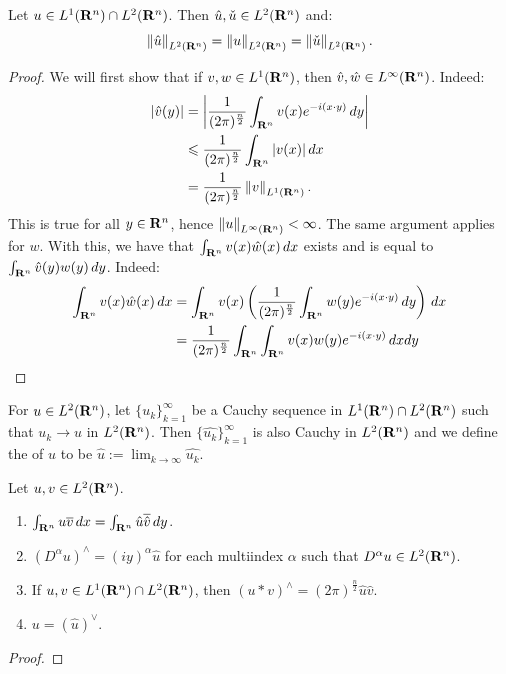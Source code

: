 \begin{theorem}[Plancharel]
	Let $u \in L^1(\mathbf{R}^n)\cap L^2(\mathbf{R}^n)$. Then $\hat{u},\check{u} \in L^2(\mathbf{R}^n)$ and:
	\[
		\left\lVert \hat{u} \right\rVert_{L^2(\mathbf{R}^n)} = \left\lVert u \right\rVert_{L^2(\mathbf{R}^n)} = \left\lVert \check{u} \right\rVert_{L^2(\mathbf{R}^n)}.
	\] 
\end{theorem}
	\begin{proof}
		We will first show that if $v,w \in L^1(\mathbf{R}^n)$, then $\hat{v},\hat{w} \in L^\infty(\mathbf{R}^n)$. Indeed:
		\begin{align*}
			|\hat{v}(y)| 
			&= \left| \frac{1}{(2\pi)^{\frac{n}{2}}} \int_{\mathbf{R}^n}^{} v(x)e^{-i (x \cdot y)}\,dy \right|  \\
			& \leqslant \frac{1}{(2\pi)^{\frac{n}{2}}} \int_{\mathbf{R}^n}^{} |v(x)|\,dx \\
			&= \frac{1}{(2 \pi)^{\frac{n}{2}}} \left\lVert v \right\rVert_{L^1(\mathbf{R}^n)}.
		\end{align*}
		This is true for all $y \in \mathbf{R}^n$, hence $\left\lVert u \right\rVert_{L^\infty(\mathbf{R}^n)} < \infty$. The same argument applies for $w$. With this, we have that $\int_{\mathbf{R}^n}^{} v(x) \hat{w}(x)\,dx$ exists and is equal to $\int_{\mathbf{R}^n}^{} \hat{v}(y)w(y)\,dy$. Indeed:
		\begin{align*}
			\int_{\mathbf{R}^n}^{} v(x)\hat{w}(x)\,dx
			&= \int_{\mathbf{R}^n}^{} v(x) \left( \frac{1}{(2\pi)^{\frac{n}{2}}} \int_{\mathbf{R}^n}^{} w(y) e^{-i (x \cdot y)}\,dy \right)\,dx \\
			&= \frac{1}{(2\pi)^{\frac{n}{2}}} \int_{\mathbf{R}^n}^{} \int_{\mathbf{R}^n}^{} v(x)w(y)e^{-i (x\cdot y)}\,dxdy\\
		\end{align*}
	\end{proof}

\begin{definition}
	For $u \in L^2(\mathbf{R}^n)$, let $\{u_k\}_{k = 1}^\infty$ be a Cauchy sequence in $L^1(\mathbf{R}^n)\cap L^2(\mathbf{R}^n)$ such that $u_k \rightarrow u$ in $L^2(\mathbf{R}^n)$. Then $\{\hat{u_k}\}_{k=1}^\infty$ is also Cauchy in $L^{2}(\mathbf{R}^n)$ and we define the  of $u$ to be $\hat{u}:= \lim_{k \rightarrow \infty}\hat{u_k}$.	
\end{definition}

\begin{theorem}
	Let $u,v \in L^2(\mathbf{R}^n)$.
	\mbox{}
	\begin{enumerate}[label = (\arabic*),itemsep=1pt,topsep=3pt]
		\item $\int_{\mathbf{R}^n}^{} u \overline{v}\,dx = \int_{\mathbf{R}^n}^{} \hat{u} \overline{\hat{v}}\,dy$.
		\item $(D^\alpha u)^\wedge = (iy)^\alpha \hat{u}$ for each multiindex $\alpha$ such that $D^\alpha u \in L^2(\mathbf{R}^n)$.
		\item If $u,v \in L^1(\mathbf{R}^n)\cap L^2(\mathbf{R}^n)$, then $(u \ast v)^\wedge = (2\pi)^{\frac{n}{2}}\hat{u} \hat{v}$.
		\item $u = (\hat{u})^\vee$.
	\end{enumerate}
\end{theorem}
	{\color{red}
	\begin{proof}
			
	\end{proof}}

